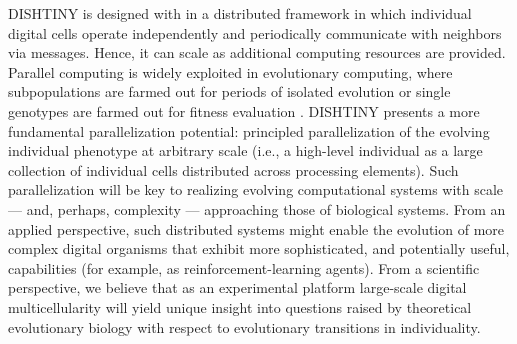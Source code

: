 DISHTINY is designed with in a distributed framework in which individual digital cells operate independently and periodically communicate with neighbors via messages.
Hence, it can scale as additional computing resources are provided.
Parallel computing is widely exploited in evolutionary computing, where subpopulations are farmed out for periods of isolated evolution or single genotypes are farmed out for fitness evaluation
\citep{lin1994coarse, real17a}.
DISHTINY presents a more fundamental parallelization potential: principled parallelization of the evolving individual phenotype at arbitrary scale (i.e., a high-level individual as a large collection of individual cells distributed across processing elements).
Such parallelization will be key to realizing evolving computational systems with scale --- and, perhaps, complexity --- approaching those of biological systems.
From an applied perspective, such distributed systems might enable the evolution of more complex digital organisms that exhibit more sophisticated, and potentially useful, capabilities (for example, as reinforcement-learning agents).
From a scientific perspective, we believe that as an experimental platform large-scale digital multicellularity will yield unique insight into questions raised by theoretical evolutionary biology with respect to evolutionary transitions in individuality.
